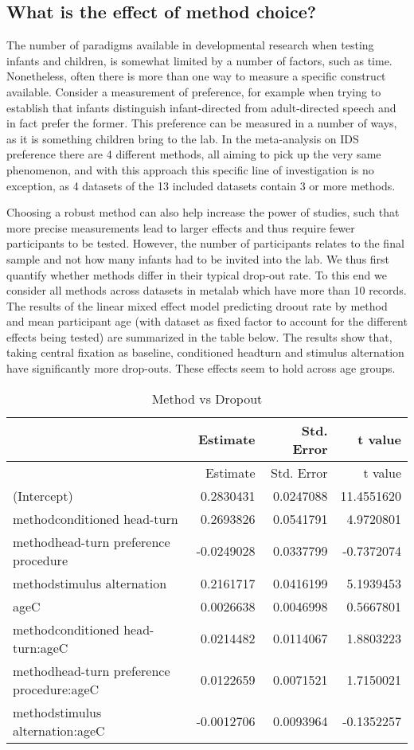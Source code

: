 \documentclass[english,floatsintext,man]{apa6}
\begin{document}
\subsection{What is the effect of method
choice?}\label{what-is-the-effect-of-method-choice}

The number of paradigms available in developmental research when testing
infants and children, is somewhat limited by a number of factors, such
as time. Nonetheless, often there is more than one way to measure a
specific construct available. Consider a measurement of preference, for
example when trying to establish that infants distinguish
infant-directed from adult-directed speech and in fact prefer the
former. This preference can be measured in a number of ways, as it is
something children bring to the lab. In the meta-analysis on IDS
preference there are 4 different methods, all aiming to pick up the very
same phenomenon, and with this approach this specific line of
investigation is no exception, as 4 datasets of the 13 included datasets
contain 3 or more methods.

Choosing a robust method can also help increase the power of studies,
such that more precise measurements lead to larger effects and thus
require fewer participants to be tested. However, the number of
participants relates to the final sample and not how many infants had to
be invited into the lab. We thus first quantify whether methods differ
in their typical drop-out rate. To this end we consider all methods
across datasets in metalab which have more than 10 records. The results
of the linear mixed effect model predicting droout rate by method and
mean participant age (with dataset as fixed factor to account for the
different effects being tested) are summarized in the table below. The
results show that, taking central fixation as baseline, conditioned
headturn and stimulus alternation have significantly more drop-outs.
These effects seem to hold across age groups.

\begin{longtable}[c]{@{}lrrr@{}}
\caption{Method vs Dropout}\tabularnewline
\toprule
& Estimate & Std. Error & t value\tabularnewline
\midrule
\endfirsthead
\toprule
& Estimate & Std. Error & t value\tabularnewline
\midrule
\endhead
(Intercept) & 0.2830431 & 0.0247088 & 11.4551620\tabularnewline
methodconditioned head-turn & 0.2693826 & 0.0541791 &
4.9720801\tabularnewline
methodhead-turn preference procedure & -0.0249028 & 0.0337799 &
-0.7372074\tabularnewline
methodstimulus alternation & 0.2161717 & 0.0416199 &
5.1939453\tabularnewline
ageC & 0.0026638 & 0.0046998 & 0.5667801\tabularnewline
methodconditioned head-turn:ageC & 0.0214482 & 0.0114067 &
1.8803223\tabularnewline
methodhead-turn preference procedure:ageC & 0.0122659 & 0.0071521 &
1.7150021\tabularnewline
methodstimulus alternation:ageC & -0.0012706 & 0.0093964 &
-0.1352257\tabularnewline
\bottomrule
\end{longtable}
\end{document}
